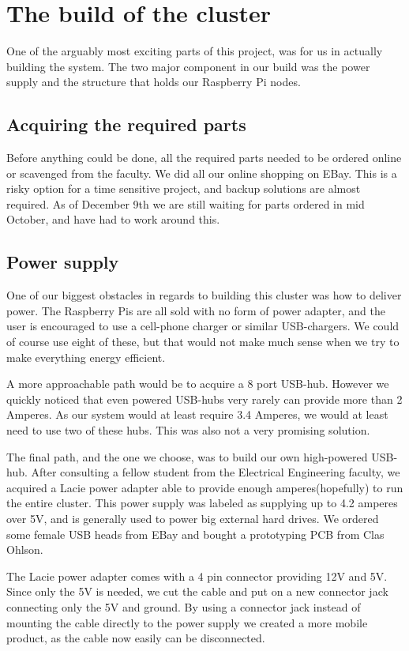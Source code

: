 \clearpage
\section{The build of the cluster}
\label{sec:build}
One of the arguably most exciting parts of this project, was for us in actually building the system. The two major component in our build was the power supply and the structure that holds our Raspberry Pi nodes. 

\subsection{Acquiring the required parts}
Before anything could be done, all the required parts needed to be ordered online or scavenged from the faculty. We did all our online shopping on EBay. This is a risky option for a time sensitive project, and backup solutions are almost required. As of December 9th we are still waiting for parts ordered in mid October, and have had to work around this.   

\subsection{Power supply}
One of our biggest obstacles in regards to building this cluster was how to deliver power. The Raspberry Pis are all sold with no form of power adapter, and the user is encouraged to use a cell-phone charger or similar USB-chargers. We could of course use eight of these, but that would not make much sense when we try to make everything energy efficient. 

A more approachable path would be to acquire a 8 port USB-hub. However we quickly noticed that even powered USB-hubs very rarely can provide more than 2 Amperes. As our system would at least require 3.4 Amperes, we would at least need to use two of these hubs. This was also not a very promising solution.

The final path, and the one we choose, was to build our own high-powered USB-hub. After consulting a fellow student from the Electrical Engineering faculty, we acquired a Lacie power adapter able to provide enough amperes(hopefully) to run the entire cluster. This power supply was labeled as supplying up to 4.2 amperes over 5V, and is generally used to power big external hard drives. We ordered some female USB heads from EBay and bought a prototyping PCB from Clas Ohlson.

The Lacie power adapter comes with a 4 pin connector providing 12V and 5V. Since only the 5V is needed, we cut the cable and put on a new connector jack connecting only the 5V and ground. By using a connector jack instead of mounting the cable directly to the power supply we created a more mobile product, as the cable now easily can be disconnected.


